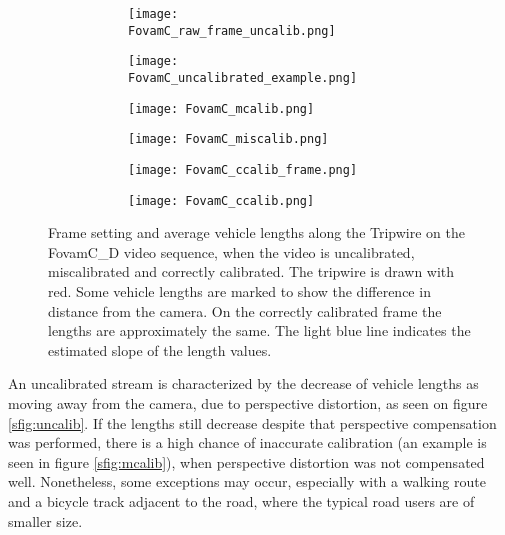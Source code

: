 \begin{figure}[!hp]
	\centering
	\begin{subfigure}[b]{\textwidth}
		\centering
		\begin{subfigure}[t]{0.45\textwidth}
		\texttt{[image: FovamC\_raw\_frame\_uncalib.png]}
		\end{subfigure}
	\quad
		\begin{subfigure}[t]{0.375\textwidth}
		\texttt{[image: FovamC\_uncalibrated\_example.png]}
		\end{subfigure}
	\end{subfigure}
	\hfill
	\begin{subfigure}[b]{\textwidth}
		\centering
		\begin{subfigure}[t]{0.45\textwidth}
			\texttt{[image: FovamC\_mcalib.png]}
		\end{subfigure}
		\quad
		\begin{subfigure}[t]{0.375\textwidth}
			\texttt{[image: FovamC\_miscalib.png]}
		\end{subfigure}
	\end{subfigure}
	\hfill
	\begin{subfigure}[b]{\textwidth}
		\centering
		\begin{subfigure}[t]{0.45\textwidth}
			\texttt{[image: FovamC\_ccalib\_frame.png]}
		\end{subfigure}
		\quad
		\begin{subfigure}[t]{0.375\textwidth}
			\texttt{[image: FovamC\_ccalib.png]}
		\end{subfigure}
	\end{subfigure}

	\caption[Characteristics of uncalibrated, miscalibrated and correctly calibrated Frame-strips]{Frame setting and average vehicle lengths along the Tripwire on the FovamC\_D video sequence, when the video is uncalibrated, miscalibrated and correctly calibrated. The tripwire is drawn with red. Some vehicle lengths are marked to show the difference in distance from the camera. On the correctly calibrated frame the lengths are approximately the same. The light blue line indicates the estimated slope of the length values.\label{fig:calibration_versions}}
\end{figure}

An uncalibrated stream is characterized by the decrease of vehicle lengths as moving away from the camera, due to perspective distortion, as seen on figure \ref{sfig:uncalib}.
If the lengths still decrease despite that perspective compensation was performed, there is a high chance of inaccurate calibration (an example is seen in figure \ref{sfig:mcalib}), when perspective distortion was not compensated well.
Nonetheless, some exceptions may occur, especially with a walking route and a bicycle track adjacent to the road, where the typical road users are of smaller size.

